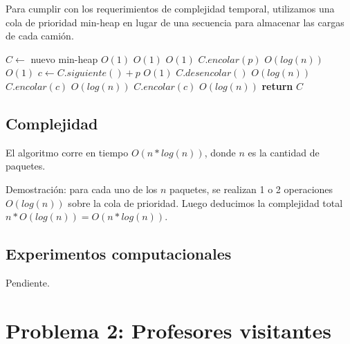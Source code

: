 \documentclass[a4paper,10pt,twoside]{article}
\newenvironment{pseudo}[1][]{%
    \vspace{0.5em}%
    \begin{algorithmic}%
}
{%
    \end{algorithmic}%
    \vspace{0.5em}%
}
\newcommand{\In}{\textbf{in} }
\newcommand{\Ode}[1]{\hfill $O(#1)$}
\begin{document}
Para cumplir con los requerimientos de complejidad temporal, utilizamos una cola de prioridad min-heap en lugar de una secuencia para almacenar las cargas de cada camión.

\begin{pseudo}
        \State $C \leftarrow$ nuevo min-heap                    \Ode{1}
        \ForAll{$p$ \In $\langle p_1, \ldots, p_n \rangle$}     \Ode{1}
                                     \Ode{1}
                \State $C.encolar(p)$                           \Ode{log(n)}
                              \Ode{1}
                \State $c \leftarrow C.siguiente() + p$         \Ode{1}
                \State $C.desencolar()$                         \Ode{log(n)}
                \State $C.encolar(c)$                           \Ode{log(n)}
            \Else
                \State $C.encolar(c)$                           \Ode{log(n)}
            \EndIf
        \EndFor
        \State \textbf{return} $C$
    \EndProcedure
\end{pseudo}


\subsection{Complejidad}

El algoritmo corre en tiempo $O(n*log(n))$, donde $n$ es la cantidad de paquetes.

Demostración: para cada uno de los $n$ paquetes, se realizan 1 o 2 operaciones $O(log(n))$ sobre la cola de prioridad. Luego deducimos la complejidad total $n * O(log(n)) = O(n * log(n))$.


\subsection{Experimentos computacionales}

Pendiente.




\section{Problema 2: Profesores visitantes}
\end{document}
